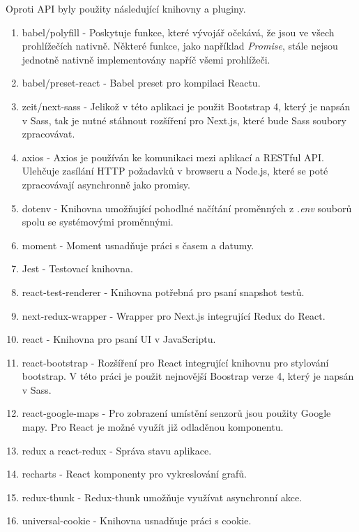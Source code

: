\documentclass[thesis=M,czech]{FITthesis}[2018/10/20]
\begin{document}
Oproti API byly použity následující knihovny a pluginy.
\begin{enumerate}
\item babel/polyfill - Poskytuje funkce, které vývojář očekává, že jsou ve všech prohlížečích nativně. Některé funkce, jako například \textit{Promise}, stále nejsou jednotně nativně implementovány napříč všemi prohlížeči.
\item babel/preset-react - Babel preset pro kompilaci Reactu.
\item zeit/next-sass - Jelikož v této aplikaci je použit Bootstrap 4, který je napsán v Sass, tak je nutné stáhnout rozšíření pro Next.js, které bude Sass soubory zpracovávat.
\item axios - Axios je používán ke komunikaci mezi aplikací a RESTful API. Ulehčuje zasílání HTTP požadavků v browseru a Node.js, které se poté zpracovávají asynchronně jako promisy.
\item dotenv - Knihovna umožňující pohodlné načítání proměnných z \textit{.env} souborů spolu se systémovými proměnnými.
\item moment - Moment usnadňuje práci s časem a datumy.
\item Jest - Testovací knihovna.
\item react-test-renderer - Knihovna potřebná pro psaní snapshot testů.
\item next-redux-wrapper - Wrapper pro Next.js integrující Redux do React.
\item react - Knihovna pro psaní UI v JavaScriptu.
\item react-bootstrap - Rozšíření pro React integrující knihovnu pro stylování bootstrap. V této práci je použit nejnovější Boostrap verze 4, který je napsán v Sass.
\item react-google-maps - Pro zobrazení umístění senzorů jsou použity Google mapy. Pro React je možné využít již odladěnou komponentu.
\item redux a react-redux - Správa stavu aplikace.
\item recharts - React komponenty pro vykreslování grafů.
\item redux-thunk - Redux-thunk umožňuje využívat asynchronní akce.
\item universal-cookie - Knihovna usnadňuje práci s cookie.
\end{enumerate}
\end{document}
